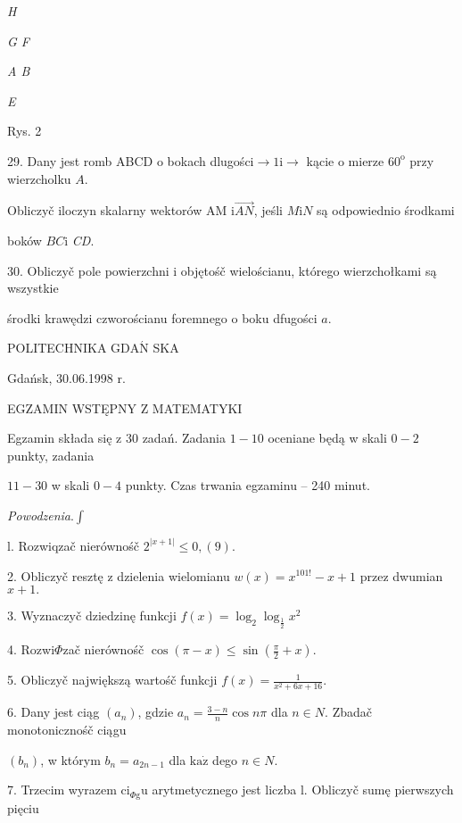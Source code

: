 \documentclass[a4paper,12pt]{article}
\begin{document}
{\it H}

{\it G F}

{\it A B}

{\it E}

Rys. 2

29. Dany jest romb ABCD o bokach dlugości$\rightarrow  1\mathrm{i}\rightarrow$ kącie o mierze $60^{\mathrm{o}}$ przy wierzcholku $A.$

Obliczyč iloczyn skalarny wektorów AM $\mathrm{i}\vec{AN}$, jeśli $M\mathrm{i}N$ są odpowiednio środkami

boków $BC\mathrm{i}$ {\it CD}.

30. Obliczyč pole powierzchni i objętośč wielościanu, którego wierzchołkami są wszystkie

środki krawędzi czworościanu foremnego o boku dfugości $a.$







POLITECHNIKA $\mathrm{G}\mathrm{D}\mathrm{A}\acute{\mathrm{N}}$ SKA

Gdańsk, 30.06.1998 r.

EGZAMIN WSTĘPNY Z MATEMATYKI

Egzamin składa się z 30 zadań. Zadania $1-10$ oceniane będą w skali $0-2$ punkty, zadania

$11-30$ w skali $0-4$ punkty. Czas trwania egzaminu -- 240 minut.

{\it Powodzenia}.$\displaystyle \int$

l. Rozwiqzač nierównośč $2^{|x+1|}\leq 0,(9).$

2. Obliczyč resztę z dzielenia wielomianu $w(x)=x^{101!}-x+1$ przez dwumian $x+1.$

3. Wyznaczyč dziedzinę funkcji $f(x)=\log_{2}\log_{\frac{1}{2}}x^{2}$

4. Rozwi$\Phi$zač nierównośč $\displaystyle \cos(\pi-x)\leq\sin(\frac{\pi}{2}+x).$

5. Obliczyč największą wartośč funkcji $f(x)=\displaystyle \frac{1}{x^{2}+6x+16}.$

6. Dany jest ciąg $(a_{n})$, gdzie $ a_{n}=\displaystyle \frac{3-n}{n}\cos n\pi$ dla $n\in N$. Zbadač monotonicznośč ciągu

$(b_{n})$, w którym $b_{n}=a_{2n-1}$ dla $\mathrm{k}\mathrm{a}\dot{\mathrm{z}}$ dego $n\in N.$

7. Trzecim wyrazem $\mathrm{c}\mathrm{i}_{\Phi \mathrm{g}}\mathrm{u}$ arytmetycznego jest liczba l. Obliczyč sumę pierwszych pięciu
\end{document}
